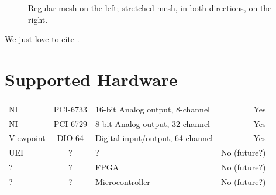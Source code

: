 \begin{figure}[hb]
    \caption{Regular mesh on the left; stretched mesh, in both directions, on
             the right.} 
    \label{fig:intro:jdk_grid_example}
\end{figure}

We just love to cite \citet{Rambo:1989}.


\section{Supported Hardware}
\begin{center}
\tablelasttail{\hline}
%
%
\begin{supertabular}{|l|c|l|r|}
  NI & PCI-6733 & 16-bit Analog output, 8-channel & Yes \\
  NI & PCI-6729 & 8-bit Analog output, 32-channel & Yes \\
  Viewpoint & DIO-64 & Digital input/output, 64-channel & Yes \\
  UEI & ? & ? & No (future?) \\
  ? & ? & FPGA & No (future?) \\
  ? & ? & Microcontroller & No (future?) \\
\end{supertabular}
\end{center}
